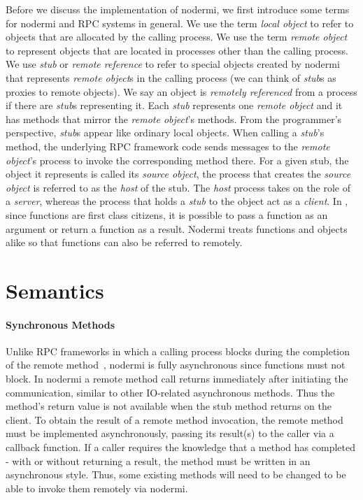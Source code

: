 Before we discuss the implementation of nodermi,
we first introduce some terms for nodermi and
RPC systems in general.
We use the term \emph{local object}
to refer to objects that are allocated by the calling process.
We use the term \emph{remote object} to represent objects that are
located in processes other than the calling process.
We use \emph{stub} or \emph{remote reference} to refer to special objects created
by nodermi that represents \emph{remote object}s in the calling process
(we can think of \emph{stub}s as proxies to remote objects).
We say an object is \emph{remotely referenced} from a process
if there are \emph{stub}s representing it.
Each \emph{stub} represents one \emph{remote object} and
it has methods that mirror the \emph{remote object}'s methods.
From the programmer's perspective,
\emph{stub}s appear like ordinary local objects.
When calling a \emph{stub}'s method, the underlying
RPC framework code sends messages to the \emph{remote object}'s process
to invoke the corresponding method there.
For a given stub,
the object it represents is called its \emph{source object},
the process that creates the \emph{source object}
is referred to as the \emph{host} of the stub.
The \emph{host} process takes on the role of a \emph{server},
whereas the process that holds a \emph{stub} to the object act as a \emph{client}.
In \js{}, since functions are first class citizens, it is possible
to pass a function as an argument or return a function as a result.
Nodermi treats functions and objects alike so that functions can also be
referred to remotely.


\section{Semantics}
\label{sec:semantics}

\nodermiexamplefig{}

\paragraph{Synchronous Methods}
Unlike RPC frameworks in which a calling process blocks during the
completion of the remote method~\cite{birrell1984implementing},
nodermi is fully asynchronous since \js{} functions must not block.
In nodermi a remote method call returns immediately after initiating the communication,
similar to other IO-related asynchronous methods.
Thus the method's return value is not available when the stub method returns on the client.
To obtain the result of a remote method invocation,
the remote method must be implemented asynchronously,
passing its result(s) to the caller via a callback function.
If a caller requires the knowledge that a method has completed - with or without
returning a result, the method must be written in an asynchronous style.
Thus, some existing methods will need to be changed to be able to invoke them
remotely via nodermi.






